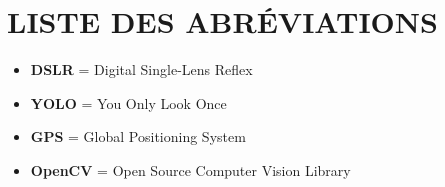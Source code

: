 \chapter*{LISTE DES ABRÉVIATIONS}
\adjustmtc
\thispagestyle{MyStyle}

\begin{itemize}[label=--]
	\item \textbf{DSLR} = Digital Single-Lens Reflex
	\item \textbf{YOLO} = You Only Look Once
	\item \textbf{GPS} = Global Positioning System
	\item \textbf{OpenCV} = Open Source Computer Vision Library

\end{itemize}
 























